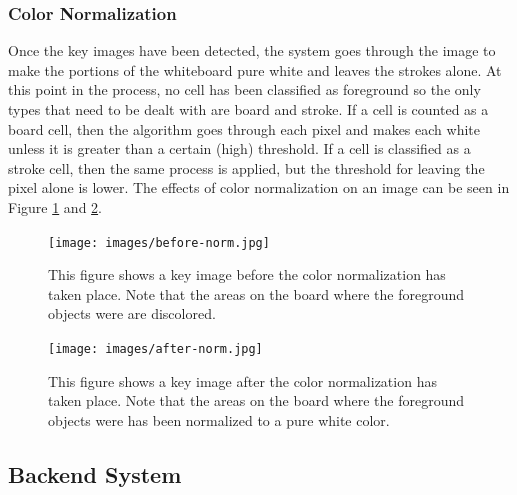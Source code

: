 \documentclass[]{article}
\begin{document}
			\subsubsection{Color Normalization}
				Once the key images have been detected, the system goes through the image to make the portions of the whiteboard pure white and leaves the strokes alone. At this point in the process, no cell has been classified as foreground so the only types that need to be dealt with are board and stroke. If a cell is counted as a board cell, then the algorithm goes through each pixel and makes each white unless it is greater than a certain (high) threshold. If a cell is classified as a stroke cell, then the same process is applied, but the threshold for leaving the pixel alone is lower. The effects of color normalization on an image can be seen in Figure \ref{img:before-norm.jpg} and \ref{img:after-norm.jpg}.
				
				\begin{figure}[h]
					\centering
					\texttt{[image: images/before-norm.jpg]}
					\caption{This figure shows a key image before the color normalization has taken place. Note that the areas on the board where the foreground objects were are discolored.}		
					\label{img:before-norm.jpg}
				\end{figure}
						
				
				\begin{figure}[h]
					\centering
					\texttt{[image: images/after-norm.jpg]}
					\caption{This figure shows a key image after the color normalization has taken place. Note that the areas on the board where the foreground objects were has been normalized to a pure white color.}
					\label{img:after-norm.jpg}
				\end{figure}
						
		\subsection{Backend System}

	
	\newpage
	
	
\end{document}
